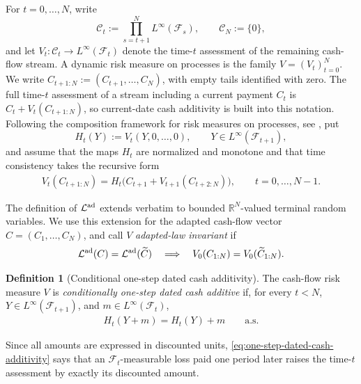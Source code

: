 \documentclass[a4paper]{amsart}
\theoremstyle{definition}
\newtheorem{definition}[definition]{Definition}
\newcommand{\R}{\mathbb{R}}
\newcommand{\F}{\mathcal{F}}
\newcommand{\law}{\mathcal{L}}
\newcommand{\lawad}{\law^{\textup{ad}}}
\begin{document}
For \(t=0,\dots,N\), write
\[
\mathcal C_t:=\prod_{s=t+1}^N L^\infty(\F_s),
\qquad
\mathcal C_N:=\{0\},
\]
and let \(V_t:\mathcal C_t\to L^\infty(\F_t)\) denote the time-\(t\)
assessment of the remaining cash-flow stream. A dynamic risk measure on processes is the family \(V=(V_t)_{t=0}^N\). We write
\(C_{t+1:N}:=(C_{t+1},\dots,C_N)\), with empty tails identified with zero.
The full time-\(t\) assessment of a stream including a current payment
\(C_t\) is \(C_t+V_t(C_{t+1:N})\), so current-date cash additivity is
built into this notation. Following the composition framework
for risk measures on processes, see
\cite{CheriditoKupper2011,AcciaioFollmerPenner2012}, put
\[
H_t(Y):=V_t(Y,0,\dots,0),
\qquad Y\in L^\infty(\F_{t+1}),
\]
and assume that the maps \(H_t\) are normalized and monotone and that time
consistency takes the recursive form
\begin{align}
V_t(C_{t+1:N})
=
H_t\bigl(C_{t+1}+V_{t+1}(C_{t+2:N})\bigr),
\qquad t=0,\dots,N-1.
\label{eq:cash-flow-time-consistency}
\end{align}

The definition of \(\lawad\) extends verbatim to bounded
\(\R^N\)-valued terminal random variables. We use this extension for the
adapted cash-flow vector \(C=(C_1,\dots,C_N)\), and call \(V\)
\emph{adapted-law invariant} if
\[
\lawad(C)=\lawad(\widetilde C)
\quad\Longrightarrow\quad
V_0(C_{1:N})=V_0(\widetilde C_{1:N}).
\]

\begin{definition}[Conditional one-step dated cash additivity]
\label{def:one-step-dated-cash-additivity}
The cash-flow risk measure \(V\) is \emph{conditionally one-step dated cash
additive} if, for every \(t<N\), \(Y\in L^\infty(\F_{t+1})\), and
\(m\in L^\infty(\F_t)\),
\begin{align}
H_t(Y+m)=H_t(Y)+m
\qquad\text{a.s.}
\label{eq:one-step-dated-cash-additivity}
\end{align}
\end{definition}

Since all amounts are expressed in discounted units,
\eqref{eq:one-step-dated-cash-additivity} says that an
\(\F_t\)-measurable loss paid one period later raises the time-\(t\)
assessment by exactly its discounted amount.
\end{document}
